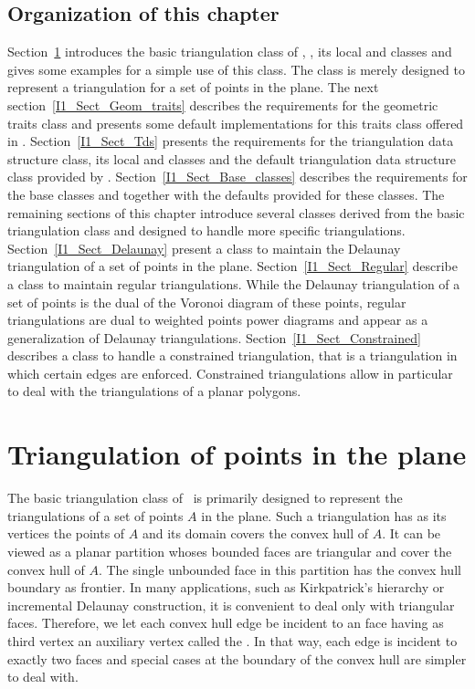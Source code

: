 \subsection*{Organization of this chapter}
Section~\ref{I1_Sect_Triangulation_2} introduces the basic triangulation class of \cgal ,
 , its local  and 
classes and gives some examples for a simple use of this class.
 The  class  is merely designed to represent 
a triangulation for a set of points in the plane.
The next section~\ref{I1_Sect_Geom_traits}
describes the requirements for the geometric
traits class and presents some default implementations
for this traits class offered in \cgal. 
Section~\ref{I1_Sect_Tds}  presents the requirements for the 
{triangulation data structure} class,
 its local  and 
classes and the default {triangulation data structure} class
provided by \cgal. 
Section~\ref{I1_Sect_Base_classes} describes the requirements
for the base classes  and   
together with the defaults provided for these classes.
The remaining sections of this chapter introduce
several classes derived from the basic triangulation class
and designed to handle more specific triangulations.
Section~\ref{I1_Sect_Delaunay} present a class to 
maintain the Delaunay triangulation of a set of points in the plane.
 Section~\ref{I1_Sect_Regular}
describe a class to maintain regular triangulations.
While the Delaunay triangulation of a set of points
is the dual of the Voronoi
diagram of these points,
 regular triangulations are dual to weighted points power diagrams
and  appear as a generalization of
Delaunay triangulations. Section~\ref{I1_Sect_Constrained} 
describes a class to handle a constrained triangulation,
that is a triangulation in which certain edges are enforced.
Constrained triangulations allow in particular to deal with the 
triangulations of a planar polygons.

 

\section{Triangulation of points in the plane }
\label{I1_Sect_Triangulation_2}

The basic triangulation class 
 of \cgal\ is primarily designed to represent the  triangulations
 of a set of points ${  A}$ in the plane.
Such a triangulation has as its vertices the points of ${  A}$
and its domain covers the convex hull of ${  A}$.
It can be viewed as a planar partition
whoses bounded faces are triangular and cover
the convex hull of ${  A}$. The single unbounded face in this partition
has the convex hull boundary  as frontier.
In many applications, such as Kirkpatrick's hierarchy
or incremental Delaunay construction, it is convenient to
deal only with triangular faces. Therefore, we let
each  convex hull edge be incident 
to an  
face having as third vertex an auxiliary vertex
called the .
 In that way, each edge is incident to exactly two faces
and special cases at the
boundary of the convex hull are simpler to deal with.



